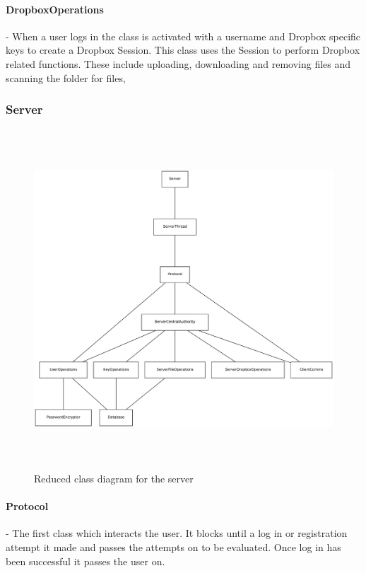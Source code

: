 \documentclass[12pt, titlepage]{article}
\begin{document}
\paragraph*{DropboxOperations} - When a user logs in the class is activated with a username and Dropbox specific keys to create a Dropbox Session. This class uses the Session to perform Dropbox related functions. These include uploading, downloading and removing files and  scanning the folder for files, 

\subsubsection{Server}

\begin{figure}
\centerline{\includegraphics[height=5.0in,width=8in,angle=0]{server-classDiagram.pdf}}
\caption{Reduced class diagram for the server}
\label{fig:reducedServerClass}
\end{figure}

\paragraph*{Protocol} - The first class which interacts the user. It blocks until a log in or registration attempt it made and passes the attempts on to be evaluated. Once log in has been successful it passes the user on.
\end{document}
